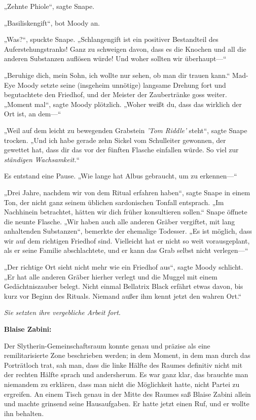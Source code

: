 {„Zehnte Phiole“, sagte Snape.

„Basiliskengift“, bot Moody an.

„Was?“, spuckte Snape. „Schlangengift ist ein positiver Bestandteil des Auferstehungstranks! Ganz zu schweigen davon, dass es die Knochen und all die anderen Substanzen auflösen würde! Und woher sollten wir überhaupt—“

„Beruhige dich, mein Sohn, ich wollte nur sehen, ob man dir trauen kann.“ Mad-Eye Moody setzte seine (insgeheim unnötige) langsame Drehung fort und begutachtete den Friedhof, und der Meister der Zaubertränke goss weiter. „Moment mal“, sagte Moody plötzlich. „Woher weißt du, dass das wirklich der Ort ist, an dem—“

„Weil auf dem leicht zu bewegenden Grabstein \emph{'Tom Riddle'} steht“, sagte Snape trocken. „Und ich habe gerade zehn Sickel vom Schulleiter gewonnen, der gewettet hat, dass dir das vor der fünften Flasche einfallen würde. So viel zur \emph{ständigen Wachsamkeit.}“

Es entstand eine Pause. „Wie lange hat Albus gebraucht, um zu erkennen—“

„Drei Jahre, nachdem wir von dem Ritual erfahren haben“, sagte Snape in einem Ton, der nicht ganz seinem üblichen sardonischen Tonfall entsprach. „Im Nachhinein betrachtet, hätten wir dich früher konsultieren sollen.“ Snape öffnete die neunte Flasche. „Wir haben auch alle anderen Gräber vergiftet, mit lang anhaltenden Substanzen“, bemerkte der ehemalige Todesser. „Es ist möglich, dass wir auf dem richtigen Friedhof sind. Vielleicht hat er nicht so weit vorausgeplant, als er seine Familie abschlachtete, und er kann das Grab selbst nicht verlegen—“

„Der richtige Ort sieht nicht mehr wie ein Friedhof aus“, sagte Moody schlicht. „Er hat alle anderen Gräber hierher verlegt und die Muggel mit einem Gedächtniszauber belegt. Nicht einmal Bellatrix Black erfährt etwas davon, bis kurz vor Beginn des Rituals. Niemand außer ihm kennt jetzt den wahren Ort.“

\emph{Sie setzten ihre vergebliche Arbeit fort.}

\textbf{Blaise Zabini:}

Der Slytherin-Gemeinschaftsraum konnte genau und präzise als eine remilitarisierte Zone beschrieben werden; in dem Moment, in dem man durch das Porträtloch trat, sah man, dass die linke Hälfte des Raumes definitiv nicht mit der rechten Hälfte sprach und andersherum. Es war ganz klar, das brauchte man niemandem zu erklären, dass man nicht die Möglichkeit hatte, nicht Partei zu ergreifen. An einem Tisch genau in der Mitte des Raumes saß Blaise Zabini allein und machte grinsend seine Hausaufgaben. Er hatte jetzt einen Ruf, und er wollte ihn behalten.

}
